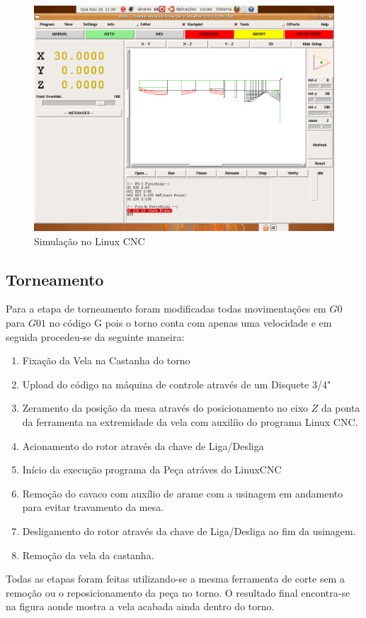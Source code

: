 \documentclass[a4paper,11pt]{article}
\begin{document}
\begin{figure}[H]
    \centering
    \includegraphics[width = 0.6\linewidth]{img/relat1/simLinuxCNC}
    \caption{Simulação no Linux CNC}
    \label{fig:vela-simLinuxCNC}
\end{figure}

\subsection{Torneamento}
Para a etapa de torneamento foram modificadas todas movimentações em $G0$ para $G01$ no código G pois o torno conta com apenas uma velocidade e em seguida procedeu-se da seguinte maneira:
\begin{enumerate}
    \item Fixação da Vela na Castanha do torno
    \item Upload do código na máquina de controle através de um Disquete 3/4"
    \item Zeramento da posição da mesa através do posicionamento no eixo $Z$ da ponta da ferramenta na extremidade da vela com auxilíio do programa Linux CNC.
    \item Acionamento do rotor através da chave de Liga/Desliga
    \item Início da execução programa da Peça atráves do LinuxCNC
    \item Remoção do cavaco com auxílio de arame com a usinagem em andamento para evitar travamento da mesa.
    \item Desligamento do rotor através da chave de Liga/Desliga ao fim da usinagem.
    \item Remoção da vela da castanha.
\end{enumerate}

Todas as etapas foram feitas utilizando-se a mesma ferramenta de corte sem a remoção ou o reposicionamento da peça no torno. O resultado final encontra-se na figura {} aonde mostra a vela acabada ainda dentro do torno.
\end{document}
